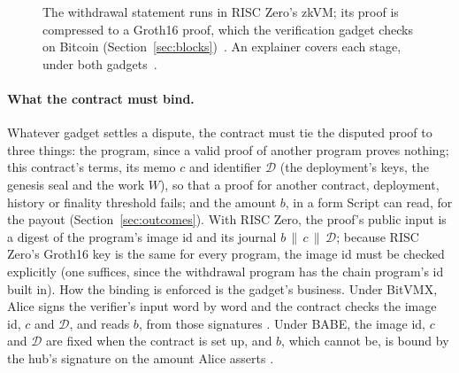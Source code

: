 \documentclass[11pt]{article}
\begin{document}
\begin{figure}[H]
\centering
{}
\caption{The withdrawal statement runs in RISC Zero's zkVM; its proof is
compressed to a Groth16 proof, which the verification gadget checks on
Bitcoin (Section~\ref{sec:blocks})~\cite{risc0}. An explainer covers each
stage, under both gadgets~\cite{pipeline}.}
\end{figure}

\paragraph{What the contract must bind.} Whatever gadget settles a
dispute, the contract must tie the disputed proof to three things: the
program, since a valid proof of another program proves nothing; this
contract's terms, its memo $c$ and identifier $\mathcal{D}$ (the deployment's keys,
the genesis seal and the work $W$), so that a proof for another contract,
deployment, history or finality threshold fails; and the amount $b$, in a
form Script can read, for the payout (Section~\ref{sec:outcomes}). With
RISC Zero, the proof's public input is a digest of the program's image id
and its journal $b \,\|\, c \,\|\, \mathcal{D}$; because RISC Zero's Groth16 key is
the same for every program, the image id must be checked explicitly (one
suffices, since the withdrawal program has the chain program's id built
in). How the binding is enforced is the gadget's business. Under BitVMX,
Alice signs the verifier's input word by word and the contract checks the
image id, $c$ and $\mathcal{D}$, and reads $b$, from those signatures
\cite[\S 2]{lichenbitvmx}. Under BABE, the image id, $c$ and $\mathcal{D}$ are fixed
when the contract is set up, and $b$, which cannot be, is bound by the
hub's signature on the amount Alice asserts \cite[\S 5]{lichenbabe}.
\end{document}
